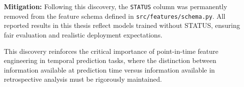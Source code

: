 \textbf{Mitigation:} Following this discovery, the \texttt{STATUS} column was permanently removed from the feature schema defined in \texttt{src/features/schema.py}. All reported results in this thesis reflect models trained without STATUS, ensuring fair evaluation and realistic deployment expectations.

This discovery reinforces the critical importance of point-in-time feature engineering in temporal prediction tasks, where the distinction between information available at prediction time versus information available in retrospective analysis must be rigorously maintained.
